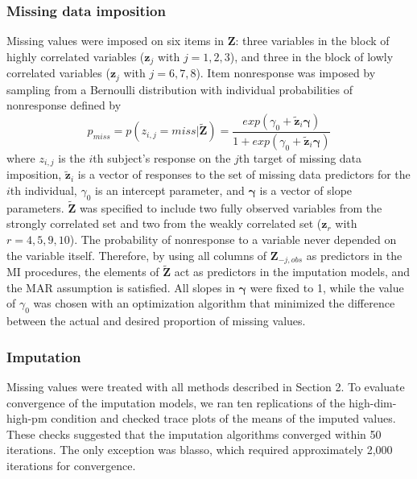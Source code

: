 \subsubsection{Missing data imposition} \label{sub_missing}

	Missing values were imposed on six items in $\bm{Z}$: three variables in the block of
	highly correlated variables ($\bm{z}_j$ with $j = 1,2,3$), and three in the block of lowly correlated variables ($\bm{z}_j$ 
	with $j = 6,7,8$).
	Item nonresponse was imposed by sampling from a Bernoulli distribution with individual probabilities of nonresponse 
	defined by 
%
	\begin{equation} \label{eqn:rm}
		p_{miss} = p(z_{i,j} = miss | \tilde{\bm{Z}}) = \frac{ exp(\gamma_0 + \tilde{\bm{z}}_{i}\bm{\gamma}) }
								{ 1 + exp(\gamma_0 + \tilde{\bm{z}}_{i}\bm{\gamma}) }
	\end{equation}
%
	where $z_{i,j}$ is the $i$th subject's response on the $j$th target of missing data imposition, 
	$\tilde{\bm{z}}_{i}$ is a vector of responses to the set of missing data predictors for the $i$th individual, $\gamma_0$ is an intercept parameter, and $\bm{\gamma}$ is a vector of slope parameters.
	$\tilde{\bm{Z}}$ was specified to include two fully observed variables from the strongly correlated set and two 
	from the weakly correlated set ($\bm{z}_r$ with $r = 4,5,9,10$).
	The probability of nonresponse to a variable never depended on the variable itself. Therefore, by using all columns of $\bm{Z}_{-j,obs}$ as predictors in the MI procedures, the elements of $\tilde{\bm{Z}}$ 
	act as predictors in the imputation models, and the MAR assumption is satisfied.
	All slopes in $\bm{\gamma}$ were fixed to 1, while the value of $\gamma_0$ was chosen with an optimization 
	algorithm that minimized the difference between the actual and desired proportion of missing values.

\subsubsection{Imputation}
	
	Missing values were treated with all methods described in Section 2.
	To evaluate convergence of the imputation models, we ran ten replications of the high-dim-high-pm condition and checked trace plots of the means of the imputed values.
	These checks suggested that the imputation algorithms converged within 50 iterations. The only exception was blasso, which required approximately 2,000 iterations for convergence.

